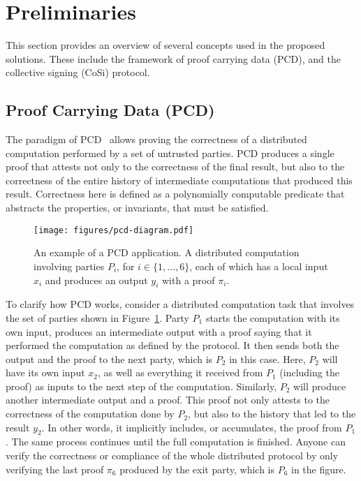 \section{Preliminaries}
\label{prelim}
This section provides an overview of several concepts used in the proposed solutions. These include the framework of proof carrying data (PCD), and the collective signing (CoSi) protocol.


\subsection{Proof Carrying Data (PCD)}
The paradigm of PCD~\cite{chiesa2010proof} allows proving the correctness of a distributed computation performed by a set of untrusted parties. PCD produces a single proof that attests not only to the correctness of the final result, but also to the correctness of the entire history of intermediate computations that produced this result. Correctness here is defined as a polynomially computable predicate that abstracts the properties, or invariants, that must be satisfied.


\begin{figure}[h!]
\centerline{
\texttt{[image: figures/pcd-diagram.pdf]}}
\caption{An example of a PCD application. A distributed computation involving parties $P_i$, for 
$i \in \{1, \dots, 6\}$, each 
of which has a local input $x_i$ and produces an output $y_i$ with a proof $\pi_i$. }
\label{pcd-diagram}
\end{figure}


To clarify how PCD works, consider a distributed computation task that involves the set of parties shown in Figure~\ref{pcd-diagram}. Party $P_1$ starts the computation with its own input, produces an intermediate output with a proof saying that it performed the computation as defined by the protocol. It then sends both the output and the proof to the next party, which is $P_2$ in this case. Here, $P_2$ will have its own input $x_2$, as well as everything it received from $P_1$ (including the proof) as inputs to the next step of the computation. Similarly, $P_2$ will produce another intermediate output and a proof. This proof not only attests to the correctness of the computation done by $P_2$, but also to the history that led to the result $y_2$. In other 
words, it implicitly includes, or accumulates, the proof from $P_1$. The same process continues until the full computation is finished. Anyone can verify the correctness or compliance of the whole distributed protocol by only verifying the last proof $\pi_6$ produced by the exit party, which is $P_6$ in the figure.


